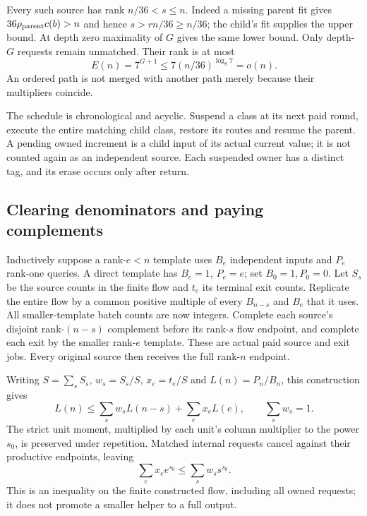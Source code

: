 Every such source has rank $n/36<s\le n$. Indeed a missing parent
fit gives $36\rho_{\rm parent}c(b)>n$ and hence
$s>rn/36\ge n/36$; the child's fit supplies the upper bound.
At depth zero maximality of $G$ gives the same lower bound.
Only depth-$G$ requests remain unmatched. Their rank is at most
\begin{equation}
 E(n)=7^{G+1}\le7(n/36)^{\log_8 7}=o(n).
 \label{eq:mixed-exits}
\end{equation}
An ordered path is not merged with another path merely because
their multipliers coincide.

The schedule is chronological and acyclic. Suspend a class at its
next paid round, execute the entire matching child class, restore
its routes and resume the parent. A pending owned increment is a
child input of its actual current value; it is not counted again as
an independent source. Each suspended owner has a distinct tag, and
its erase occurs only after return.

\subsection{Clearing denominators and paying complements}
Inductively suppose a rank-$e<n$ template uses $B_e$ independent
inputs and $P_e$ rank-one queries. A direct template has $B_e=1$,
$P_e=e$; set $B_0=1,P_0=0$. Let $S_s$ be the source counts in the
finite flow and $t_e$ its terminal exit counts. Replicate the entire
flow by a common positive multiple of every $B_{n-s}$ and $B_e$
that it uses. All smaller-template batch counts are now integers.
Complete each source's disjoint rank-$(n-s)$ complement before its
rank-$s$ flow endpoint, and complete each exit by the smaller
rank-$e$ template. These are actual paid source and exit jobs.
Every original source then receives the full rank-$n$ endpoint.

Writing $S=\sum_sS_s$, $w_s=S_s/S$, $x_e=t_e/S$ and
$L(n)=P_n/B_n$, this construction gives
\begin{equation}
 L(n)\le\sum_s w_sL(n-s)+\sum_e x_eL(e),\qquad
 \sum_s w_s=1.
 \label{eq:mixed-recurrence}
\end{equation}
The strict unit moment, multiplied by each unit's column multiplier
to the power $s_0$, is preserved under repetition. Matched internal
requests cancel against their productive endpoints, leaving
\begin{equation}
 \sum_e x_e e^{s_0}\le\sum_s w_s s^{s_0}.
 \label{eq:mixed-boundary-moment}
\end{equation}
This is an inequality on the finite constructed flow, including all
owned requests; it does not promote a smaller helper to a full output.

